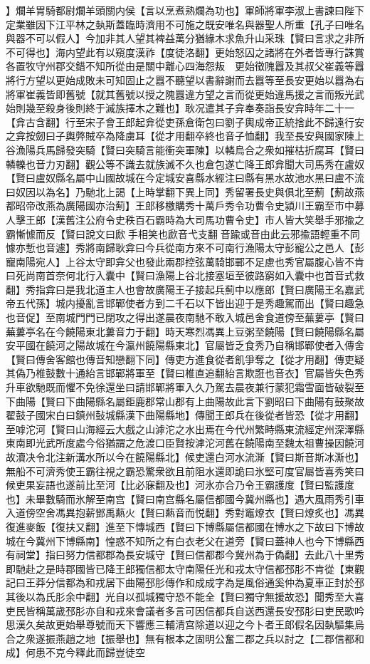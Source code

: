 】爛羊胃騎都尉爛羊頭關内侯【言以烹煮熟爛為功也】軍師將軍李淑上書諫曰陛下定業雖因下江平林之埶斯蓋臨時濟用不可施之既安唯名與器聖人所重【孔子曰唯名與器不可以假人】今加非其人望其裨益萬分猶緣木求魚升山采珠【賢曰言求之非所不可得也】海内望此有以窺度漢祚【度徒洛翻】更始怒囚之諸將在外者皆專行誅賞各置牧守州郡交錯不知所從由是關中離心四海怨叛　更始徵隗囂及其叔父崔義等囂將行方望以更始成敗未可知固止之囂不聽望以書辭謝而去囂等至長安更始以囂為右將軍崔義皆即舊號【就其舊號以授之隗囂違方望之言而從更始違馬援之言而叛光武始則幾至殺身後則終于滅族擇木之難也】耿况遣其子弇奉奏詣長安弇時年二十一【弇古含翻】行至宋子會王郎起弇從吏孫倉衛包曰劉子輿成帝正統捨此不歸遠行安之弇按劒曰子輿弊賊卒為降虜耳【從才用翻卒終也音子恤翻】我至長安與國家陳上谷漁陽兵馬歸發突騎【賢曰突騎言能衝突軍陳】以轔烏合之衆如摧枯折腐耳【賢曰轔轢也音力刃翻】觀公等不識去就族滅不久也倉包遂亡降王郎弇聞大司馬秀在盧奴【賢曰盧奴縣名屬中山國故城在今定城安喜縣水經注曰縣有黑水故池水黑曰盧不流曰奴因以為名】乃馳北上謁【上時掌翻下異上同】秀留署長史與俱北至薊【薊故燕都昭帝改燕為廣陽國亦治薊】王郎移檄購秀十萬戶秀令功曹令史潁川王霸至市中募人擊王郎【漢舊注公府令史秩百石霸時為大司馬功曹令史】市人皆大笑舉手邪揄之霸慚懅而反【賢曰說文曰歋手相笑也歋音弋支翻音踰或音由此云邪揄語輕重不同懅亦慙也音遽】秀將南歸耿弇曰今兵從南方來不可南行漁陽太守彭寵公之邑人【彭寵南陽宛人】上谷太守即弇父也發此兩郡控弦萬騎邯鄲不足慮也秀官屬腹心皆不肯曰死尚南首奈何北行入囊中【賢曰漁陽上谷北接塞垣至彼路窮如入囊中也首音式救翻】秀指弇曰是我北道主人也會故廣陽王子接起兵薊中以應郎【賢曰廣陽王名嘉武帝五代孫】城内擾亂言邯鄲使者方到二千石以下皆出迎于是秀趣駕而出【賢曰趣急也音促】至南城門門已閉攻之得出遂晨夜南馳不敢入城邑舍食道傍至蕪蔞亭【賢曰蕪蔞亭名在今饒陽東北蔞音力于翻】時天寒烈馮異上豆粥至饒陽【賢曰饒陽縣名屬安平國在饒河之陽故城在今瀛州饒陽縣東北】官屬皆乏食秀乃自稱邯鄲使者入傳舍【賢曰傳舍客館也傳音知戀翻下同】傳吏方進食從者飢爭奪之【從才用翻】傳吏疑其偽乃椎鼓數十通紿言邯鄲將軍至【賢曰椎直追翻紿言欺誑也音衣】官屬皆失色秀升車欲馳既而懼不免徐還坐曰請邯鄲將軍入久乃駕去晨夜兼行蒙犯霜雪面皆破裂至下曲陽【賢曰下曲陽縣名屬鉅鹿郡常山郡有上曲陽故此言下劉昭曰下曲陽有鼓聚故翟鼓子國宋白曰鎮州鼔城縣漢下曲陽縣地】傳聞王郎兵在後從者皆恐【從才用翻】至嘑沱河【賢曰山海經云大戲之山滹沱之水出焉在今代州繁畤縣東流經定州深澤縣東南即光武所度處今俗猶謂之危渡口臣賢按滹沱河舊在饒陽南至魏太祖曹操因饒河故瀆决令北注新溝水所以今在饒陽縣北】候吏還白河水流澌【賢曰斯音斯冰澌也】無船不可濟秀使王霸往視之霸恐驚衆欲且前阻水還即詭曰氷堅可度官屬皆喜秀笑曰候吏果妄語也遂前比至河【比必寐翻及也】河氷亦合乃令王霸護度【賢曰監護度也】未畢數騎而氷解至南宫【賢曰南宫縣名屬信都國今冀州縣也】遇大風雨秀引車入道傍空舍馮異抱薪鄧禹爇火【賢曰爇音而悦翻】秀對竈燎衣【賢曰燎炙也】馮異復進麥飯【復扶又翻】進至下慱城西【賢曰下博縣屬信都國在博水之下故曰下博故城在今冀州下博縣南】惶惑不知所之有白衣老父在道旁【賢曰蓋神人也今下博縣西有祠堂】指曰努力信都郡為長安城守【賢曰信都郡今冀州為于偽翻】去此八十里秀即馳赴之是時郡國皆已降王郎獨信都太守南陽任光和戎太守信都邳肜不肯從【東觀記曰王莽分信都為和戎居下曲陽邳肜傳作和成成字為是風俗通奚仲為夏車正封於邳其後以為氏肜余中翻】光自以孤城獨守恐不能全【賢曰獨守無援故恐】聞秀至大喜吏民皆稱萬歲邳肜亦自和戎來會議者多言可因信都兵自送西還長安邳肜曰吏民歌吟思漢久矣故更始舉尊號而天下響應三輔清宫除道以迎之今卜者王郎假名因埶驅集烏合之衆遂振燕趙之地【振舉也】無有根本之固明公奮二郡之兵以討之【二郡信都和成】何患不克今釋此而歸豈徒空